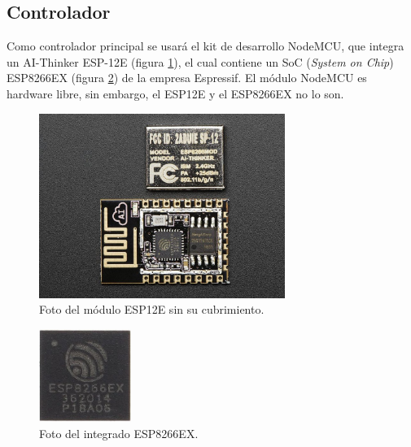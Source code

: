 \subsection{Controlador}
Como controlador principal se usará el kit de desarrollo NodeMCU, que integra un AI-Thinker ESP-12E (figura \ref{fig:foto-esp12e}), el cual contiene un SoC (\emph{System on Chip}) ESP8266EX (figura \ref{fig:esp8266ex}) de la empresa Espressif. El módulo NodeMCU es hardware libre, sin embargo, el ESP12E y el ESP8266EX no lo son.\cite{NodeMCU}

\begin{figure}[ht!]
	\begin{center}
		\includegraphics[width=8cm]{imagenes/esp12e-foto.jpg}
		\caption{Foto del módulo ESP12E sin su cubrimiento.}
		\label{fig:foto-esp12e}
	\end{center}
\end{figure}

\begin{figure}[ht!]
	\begin{center}
		\includegraphics[width=3cm]{imagenes/esp8266ex.jpg}
		\caption{Foto del integrado ESP8266EX.}
		\label{fig:esp8266ex}
	\end{center}
\end{figure}

